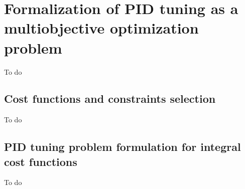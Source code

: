 %
\section{Formalization of PID tuning as a multiobjective optimization problem}
\label{sec:FormPIDMOOP}
To do
\subsection{Cost functions and constraints selection}
\label{sec:CostFunSelec}
To do
\subsection{PID tuning problem formulation for integral cost functions}
\label{sec:CostProbPID}
To do